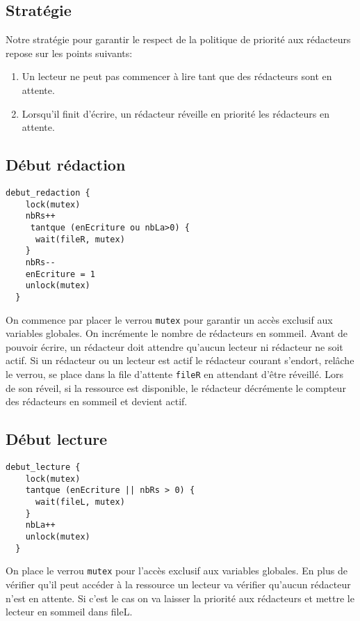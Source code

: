 \documentclass[11pt]{article}
\theoremstyle{definition}
\theoremstyle{definition}
\begin{document}
\subsection{Stratégie}
Notre stratégie pour garantir le respect de la politique de priorité aux rédacteurs repose sur les points suivants:
\begin{enumerate}
\item Un lecteur ne peut pas commencer à lire tant que des rédacteurs sont en attente.
\item Lorsqu'il finit d'écrire, un rédacteur réveille en priorité les rédacteurs en attente.
\end{enumerate}

\subsection{Début rédaction}
\begin{lstlisting}[columns=fixed,basicstyle=\small\ttfamily]
  debut_redaction {
    lock(mutex)
    nbRs++
     tantque (enEcriture ou nbLa>0) {
      wait(fileR, mutex)
    }
    nbRs--
    enEcriture = 1
    unlock(mutex)
  }
\end{lstlisting}
On commence par placer le verrou \texttt{mutex} pour garantir un accès exclusif aux variables globales. On incrémente le nombre de rédacteurs en sommeil.
Avant de pouvoir écrire, un rédacteur doit attendre qu'aucun lecteur ni rédacteur ne soit actif. Si un rédacteur ou un lecteur est actif le rédacteur courant s'endort, relâche le verrou,
se place dans la file d'attente \texttt{fileR} en attendant d'être réveillé. Lors de son réveil,
si la ressource est disponible, le rédacteur décrémente le compteur des rédacteurs en sommeil et devient actif.

\subsection{Début lecture}
\begin{lstlisting}[columns=fixed,basicstyle=\small\ttfamily]
  debut_lecture {
    lock(mutex)
    tantque (enEcriture || nbRs > 0) {
      wait(fileL, mutex)
    }
    nbLa++
    unlock(mutex)
  }
\end{lstlisting}
On place le verrou \texttt{mutex} pour l'accès exclusif aux variables globales.
En plus de vérifier qu'il peut accéder à la ressource un lecteur va vérifier qu'aucun rédacteur n'est en attente. Si c'est le cas on va laisser la priorité aux rédacteurs et mettre le lecteur en sommeil dans fileL.
\end{document}
